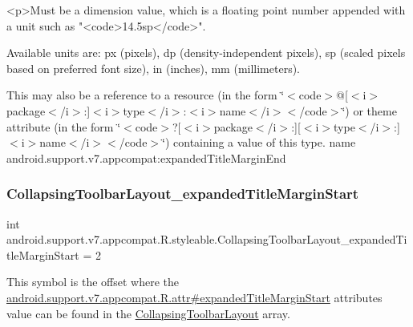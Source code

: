 \begin{DoxyVerb}      <p>Must be a dimension value, which is a floating point number appended with a unit such as "<code>14.5sp</code>".
\end{DoxyVerb}
 Available units are\+: px (pixels), dp (density-\/independent pixels), sp (scaled pixels based on preferred font size), in (inches), mm (millimeters). 

This may also be a reference to a resource (in the form \char`\"{}$<$code$>$@\mbox{[}$<$i$>$package$<$/i$>$\+:\mbox{]}$<$i$>$type$<$/i$>$\+:$<$i$>$name$<$/i$>$$<$/code$>$\char`\"{}) or theme attribute (in the form \char`\"{}$<$code$>$?\mbox{[}$<$i$>$package$<$/i$>$\+:\mbox{]}\mbox{[}$<$i$>$type$<$/i$>$\+:\mbox{]}$<$i$>$name$<$/i$>$$<$/code$>$\char`\"{}) containing a value of this type.  name android.\+support.\+v7.\+appcompat\+:expanded\+Title\+Margin\+End \mbox{\label{classandroid_1_1support_1_1v7_1_1appcompat_1_1R_1_1styleable_a1f5a83e047a2bec57c2d0fe4f5fff481}} 
\subsubsection{\texorpdfstring{Collapsing\+Toolbar\+Layout\+\_\+expanded\+Title\+Margin\+Start}{CollapsingToolbarLayout\_expandedTitleMarginStart}}
{\footnotesize\ttfamily int android.\+support.\+v7.\+appcompat.\+R.\+styleable.\+Collapsing\+Toolbar\+Layout\+\_\+expanded\+Title\+Margin\+Start = 2\hspace{0.3cm}{\ttfamily [static]}}

This symbol is the offset where the \hyperlink{classandroid_1_1support_1_1v7_1_1appcompat_1_1R_1_1attr_a2d39a2245400f68ecb7cd82e84823f57}{android.\+support.\+v7.\+appcompat.\+R.\+attr\#expanded\+Title\+Margin\+Start} attribute\textquotesingle{}s value can be found in the \hyperlink{classandroid_1_1support_1_1v7_1_1appcompat_1_1R_1_1styleable_a8d282d917f35e5a08dd37db243410383}{Collapsing\+Toolbar\+Layout} array.

